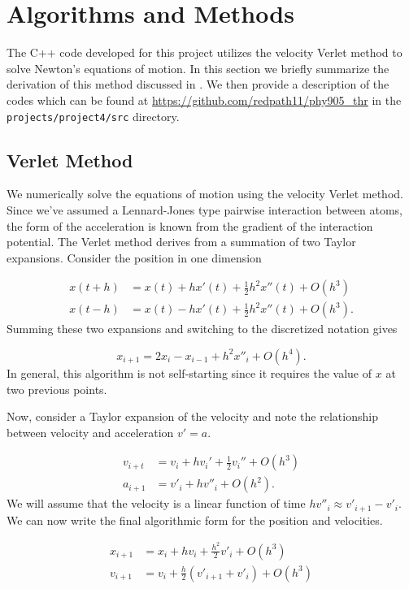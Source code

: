 \documentclass[10pt,showpacs,preprintnumbers,footinbib,amsmath,amssymb,aps,prl,twocolumn,groupedaddress,superscriptaddress,showkeys]{revtex4-1}
\begin{document}
\section*{Algorithms and Methods}

The C++ code developed for this project utilizes the velocity
Verlet method to solve Newton's equations of motion. In this section we briefly
summarize the derivation of this method discussed in \citet{Morten}. We
then provide a description of the codes which can be
found at \url{https://github.com/redpath11/phy905_thr} in the
\texttt{projects/project4/src} directory.

\subsection*{Verlet Method}

We numerically solve the equations of motion using the velocity
Verlet method. Since we've assumed a Lennard-Jones type
pairwise interaction between atoms, the form of the acceleration
is known from the gradient of the interaction potential. The Verlet
method derives from a summation of two Taylor expansions. Consider
the position in one dimension

\begin{align*}
	x(t+h) &= x(t) + h x'(t) + \frac{1}{2} h^2  x''(t) + O(h^3)\\
	x(t-h) &= x(t)  - h x'(t) + \frac{1}{2} h^2  x''(t) + O(h^3).
\end{align*}
Summing these two expansions and switching to the discretized
notation gives

\begin{equation*}
	x_{i+1} = 2 x_i - x_{i-1} + h^2 x''_i + O(h^4).
\end{equation*}
In general, this algorithm is not self-starting since it requires the
value of $x$ at two previous points.

Now, consider a Taylor expansion of the velocity and note the
relationship between velocity and acceleration $v' = a$.

\begin{align*}
	v_{i+t} &= v_i + h v_i ' + \frac{1}{2} v_i '' + O(h^3)\\
	a_{i+1} &= v'_i + h v''_i + O(h^2).
\end{align*}
We will assume that the velocity is a linear function of time
$hv''_i \approx v'_{i+1} - v'_i$. We can now write the final
algorithmic form for the position and velocities.

\begin{align}
	x_{i+1} &= x_i + hv_i + \frac{h^2}{2} v'_i + O(h^3)\\
	v_{i+1} &= v_i + \frac{h}{2}(v'_{i+1} + v'_i) + O(h^3)
\label{eq:Verlet}
\end{align}
\end{document}
